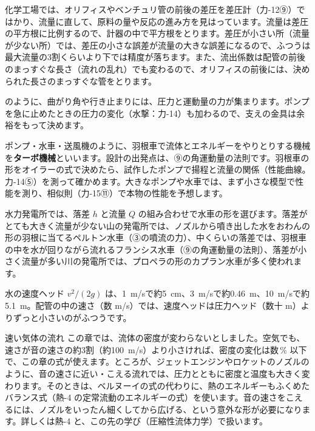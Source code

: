 \begin{phkougaku}
化学工場では、オリフィスやベンチュリ管の前後の差圧を差圧計（力-12⑨）ではかり、流量に直して、原料の量や反応の進み方を見はっています。流量は差圧の平方根に比例するので、計器の中で平方根をとります。差圧が小さい所（流量が少ない所）では、差圧の小さな誤差が流量の大きな誤差になるので、ふつうは最大流量の3割くらいより下では精度が落ちます。また、流出係数は配管の前後のまっすぐな長さ（流れの乱れ）でも変わるので、オリフィスの前後には、決められた長さのまっすぐな管をとります。

のように、曲がり角や行き止まりには、圧力と運動量の力が集まります。ポンプを急に止めたときの圧力の変化（水撃：力-14）も加わるので、支えの金具は余裕をもって決めます。

ポンプ・水車・送風機のように、羽根車で流体とエネルギーをやりとりする機械を\textbf{ターボ機械}といいます。設計の出発点は、⑨の角運動量の法則です。羽根車の形をオイラーの式で決めたら、試作したポンプで揚程と流量の関係（性能曲線。力-14⑤）を測って確かめます。大きなポンプや水車では、まず小さな模型で性能を測り、相似則（力-15⑪）で本物の性能を予想します。

水力発電所では、落差 $h$ と流量 $Q$ の組み合わせで水車の形を選びます。落差がとても大きく流量が少ない山の発電所では、ノズルから噴き出した水をおわんの形の羽根に当てるペルトン水車（③の噴流の力）、中くらいの落差では、羽根車の中を水が回りながら流れるフランシス水車（⑨の角運動量の法則）、落差が小さく流量が多い川の発電所では、プロペラの形のカプラン水車が多く使われます。

\begin{phketa}[流れの速さ・圧力・力]
水の速度ヘッド $v^2/(2g)$ は、\qty{1}{m/s}で約\qty{5}{cm}、\qty{3}{m/s}で約\qty{0.46}{m}、\qty{10}{m/s}で約\qty{5.1}{m}。配管の中の速さ（数 m/s）では、速度ヘッドは圧力ヘッド（数十 m）よりずっと小さいのがふつうです。
\end{phketa}
\end{phkougaku}
\begin{phsaki}{速い気体の流れ}
この章では、流体の密度が変わらないとしました。空気でも、速さが音の速さの約3割（約\qty{100}{m/s}）より小さければ、密度の変化は数\,\% 以下で、この章の式が使えます。ところが、ジェットエンジンやロケットのノズルのように、音の速さに近い・こえる流れでは、圧力とともに密度と温度も大きく変わります。そのときは、ベルヌーイの式の代わりに、熱のエネルギーもふくめたバランス式（熱-4 の定常流動のエネルギーの式）を使います。音の速さをこえるには、ノズルをいったん細くしてから広げる、という意外な形が必要になります。詳しくは熱-4 と、この先の学び（圧縮性流体力学）で扱います。
\end{phsaki}
